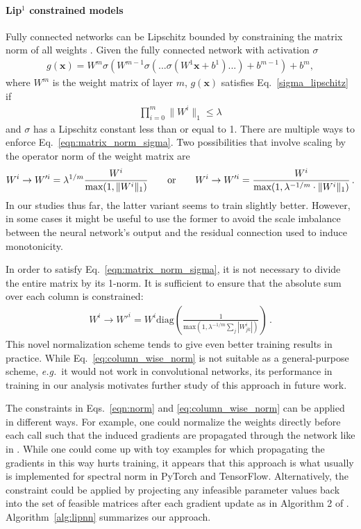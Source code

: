 \documentclass{article}
\begin{document}
\paragraph{\texorpdfstring{Lip$^1$}{Lip-1} constrained models}
Fully connected networks can be Lipschitz bounded by constraining the matrix
norm of all weights \cite{p_norm_paper, spectral2018}.
Given the fully connected network with activation $\sigma$
\begin{align}
\label{eqn:gx}
g(\bm{x}) = W^m \sigma ( W^{m-1} \sigma ( ... \sigma(W^1 \bm{x} + b^1) ... )
             + b^{m-1} ) + b^m,
\end{align}
where $W^m$ is the weight matrix of layer $m$, $g(\bm{x})$ satisfies Eq.~\eqref{sigma_lipschitz} if
\begin{align} \label{eqn:matrix_norm_sigma}
\prod_{i=0}^m \|W^i\|_1 \leq \lambda
\end{align}
and $\sigma$ has a Lipschitz constant less than or equal to 1.
There are multiple ways to enforce Eq.~\eqref{eqn:matrix_norm_sigma}.
Two possibilities that involve scaling by the operator norm of the weight matrix \cite{p_norm_paper} are
\begin{align}
\label{eqn:norm}
W^i \rightarrow W'^i = \lambda^{1/m} \frac{W^i}{\text{max}(1, \| W^i \|_1)}
\qquad {\rm or} \qquad  W^i \rightarrow W'^i = \frac{W^i}{\text{max}(1, \lambda^{-1/m} \cdot \| W^i \|_1)}\,.
\end{align}
In our studies thus far, the latter variant seems to train slightly better.
However, in some cases it might be useful to use the former to avoid the scale imbalance between the neural network's output and the residual connection used to induce monotonicity.

In order to satisfy Eq.~\eqref{eqn:matrix_norm_sigma}, it is not necessary to divide
the entire matrix by its 1-norm. It is sufficient to ensure that
the absolute sum over each column is constrained:
\begin{align} \label{eq:column_wise_norm}
W^i \rightarrow W'^i =W^i\mathrm{diag} \left(\frac{1}{\text{max}\left(1, \lambda^{-1/m} \sum_j |W^i_{jk}|\right)}\right)\,.
\end{align}
This novel normalization scheme tends to give even better training results in practice. 
While Eq.~\eqref{eq:column_wise_norm} is not suitable as a general-purpose scheme, {\em e.g.}\ it would not work in convolutional networks, its performance in training in our analysis motivates further study of this approach in future work. 

The constraints in Eqs.~\eqref{eqn:norm} and \eqref{eq:column_wise_norm} can be applied in different ways. For example, one could normalize the weights directly before each call such that the induced gradients are propagated through the network like in \cite{spectral2018}. While one could come up with toy examples for which propagating the gradients in this way hurts training, it appears that this approach is what usually is implemented for spectral norm \cite{spectral2018} in PyTorch and TensorFlow. Alternatively, the constraint could be applied by projecting any infeasible parameter values back into the set of feasible matrices after each gradient update as in Algorithm 2 of \cite{p_norm_paper}. 
Algorithm~\ref{alg:lipnn} summarizes our approach. 
\end{document}
